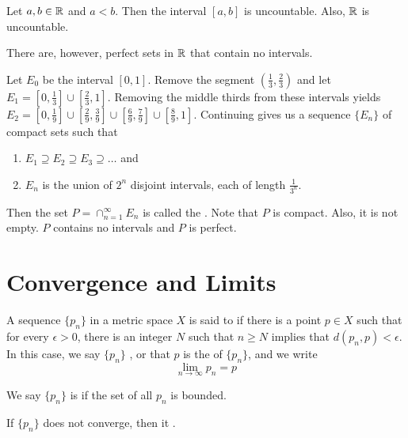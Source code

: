 \documentclass{mathnotes}
\begin{document}
\begin{prop}
  Let $a,b\in\mathbb{R}$ and $a<b$. Then the interval $[a,b]$ is uncountable. Also,
  $\mathbb{R}$ is uncountable.
\end{prop}

\begin{note}
  There are, however, perfect sets in $\mathbb{R}$ that contain no intervals.
\end{note}

\begin{ex}
  Let $E_0$ be the interval $[0,1]$. Remove the segment
  $(\frac{1}{3},\frac{2}{3})$ and let $E_1=[0,\frac{1}{3}]
  \cup[\frac{2}{3},1]$. Removing the middle thirds from these intervals yields
  $E_2=[0,\frac{1}{9}] \cup[\frac{2}{9},\frac{3}{9}]
  \cup[\frac{6}{9},\frac{7}{9}] \cup[\frac{8}{9},1]$. Continuing gives us a
  sequence $\{E_n\}$ of compact sets such that
  \begin{enumerate}
    \item $E_1\supseteq E_2\supseteq E_3\supseteq\ldots$ and
    \item $E_n$ is the union of $2^n$ disjoint intervals, each of length
      $\frac{1}{3^n}$.
  \end{enumerate}
  Then the set $P=\cap_{n=1}^\infty E_n$ is called the .
  Note that $P$ is compact. Also, it is not empty. $P$ contains no intervals
  and $P$ is perfect.
\end{ex}

\section*{Convergence and Limits}

\begin{bdefi}
  A sequence $\{p_n\}$ in a metric space $X$ is said to  if
  there is a point $p\in X$ such that for every $\epsilon>0$, there is an
  integer $N$ such that $n\ge N$ implies that $d(p_n,p)<\epsilon$. In this
  case, we say $\{p_n\}$ , or that $p$ is the
   of $\{p_n\}$, and we write
  $$\lim_{n\to\infty}p_n=p$$
\end{bdefi}

\begin{defi}
  We say $\{p_n\}$ is  if the set of all $p_n$ is bounded.
\end{defi}

\begin{defi}
  If $\{p_n\}$ does not converge, then it .
\end{defi}
\end{document}
